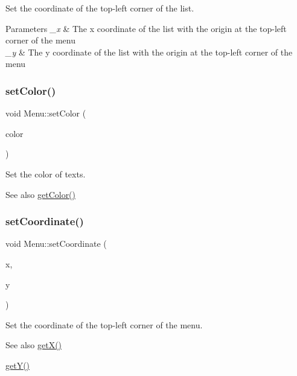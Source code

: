 Set the coordinate of the top-\/left corner of the list. 


\begin{DoxyParams}{Parameters}
{\em \+\_\+x} & The x coordinate of the list with the origin at the top-\/left corner of the menu \\
\hline
{\em \+\_\+y} & The y coordinate of the list with the origin at the top-\/left corner of the menu \\
\hline
\end{DoxyParams}
\mbox{\label{class_menu_a5e8e5869de44c9c592780bbebed30be5}} 
\subsubsection{\texorpdfstring{set\+Color()}{setColor()}}
{\footnotesize\ttfamily void Menu\+::set\+Color (\begin{DoxyParamCaption}\item[{const \mbox{\hyperlink{class_r_g_b_color}{R\+G\+B\+Color}} \&}]{color }\end{DoxyParamCaption})}



Set the color of texts. 

\begin{DoxySeeAlso}{See also}
\mbox{\hyperlink{class_menu_af5046c732ceebbb3fc86b42f79d55873}{get\+Color()}} 
\end{DoxySeeAlso}
\mbox{\label{class_menu_a27d7e75ca0a6d80e9a8c299d858f5dc3}} 
\subsubsection{\texorpdfstring{set\+Coordinate()}{setCoordinate()}}
{\footnotesize\ttfamily void Menu\+::set\+Coordinate (\begin{DoxyParamCaption}\item[{const int \&}]{x,  }\item[{const int \&}]{y }\end{DoxyParamCaption})}



Set the coordinate of the top-\/left corner of the menu. 

\begin{DoxySeeAlso}{See also}
\mbox{\hyperlink{class_menu_a75345bb25315b3cbcc98ad276e043f4d}{get\+X()}} 

\mbox{\hyperlink{class_menu_a2daa248a3bc22bfbd0931337ea8299ae}{get\+Y()}} 
\end{DoxySeeAlso}
\mbox{\label{class_menu_a54f1e7a7bb1cd809477f8e8b2e578366}} 
